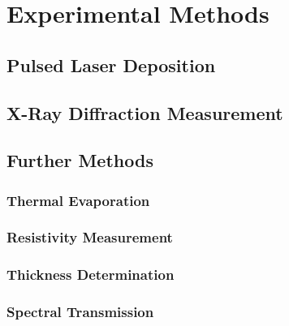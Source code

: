 \chapter{Experimental Methods}
\minitoc

\section{Pulsed Laser Deposition}
    

\section{X-Ray Diffraction Measurement}
    

\section{Further Methods}
    \subsection{Thermal Evaporation}
        
    \subsection{Resistivity Measurement}
        
            \label{Sec:Methods_vanDerPauw}
    \subsection{Thickness Determination}
        
    \subsection{Spectral Transmission}
        
            \label{Sec:Methods_transmission}